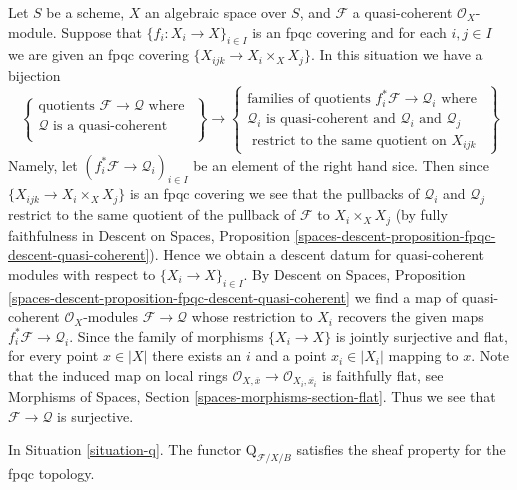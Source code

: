 \begin{remark}
\label{remark-q-sheaf}
Let $S$ be a scheme, $X$ an algebraic space over $S$, and $\mathcal{F}$
a quasi-coherent $\mathcal{O}_X$-module. Suppose that
$\{f_i : X_i \to X\}_{i \in I}$
is an fpqc covering and for each $i, j \in I$ we are given an fpqc covering
$\{X_{ijk} \to X_i \times_X X_j\}$. In this situation we have a bijection
$$
\left\{
\begin{matrix}
\text{quotients }\mathcal{F} \to \mathcal{Q}\text{ where } \\
\mathcal{Q}\text{ is a quasi-coherent }\\
\end{matrix}
\right\}
\longrightarrow
\left\{
\begin{matrix}
\text{families of quotients }f_i^*\mathcal{F} \to \mathcal{Q}_i
\text{ where } \\
\mathcal{Q}_i\text{ is quasi-coherent and }
\mathcal{Q}_i\text{ and }\mathcal{Q}_j\\
\text{ restrict to the same quotient on }X_{ijk}
\end{matrix}
\right\}
$$
Namely, let $(f_i^*\mathcal{F} \to \mathcal{Q}_i)_{i \in I}$
be an element of the right hand sice. Then since
$\{X_{ijk} \to X_i \times_X X_j\}$ is an fpqc covering we see that
the pullbacks of $\mathcal{Q}_i$ and $\mathcal{Q}_j$ restrict
to the same quotient of the pullback of $\mathcal{F}$ to $X_i \times_X X_j$
(by fully faithfulness in
Descent on Spaces, Proposition
\ref{spaces-descent-proposition-fpqc-descent-quasi-coherent}).
Hence we obtain a descent datum for quasi-coherent modules
with respect to $\{X_i \to X\}_{i \in I}$. By
Descent on Spaces, Proposition
\ref{spaces-descent-proposition-fpqc-descent-quasi-coherent}
we find a map of quasi-coherent $\mathcal{O}_X$-modules
$\mathcal{F} \to \mathcal{Q}$ whose restriction to $X_i$ recovers
the given maps $f_i^*\mathcal{F} \to \mathcal{Q}_i$.
Since the family of morphisms $\{X_i \to X\}$ is jointly surjective
and flat, for every point $x \in |X|$ there exists an $i$ and a point
$x_i \in |X_i|$ mapping to $x$. Note that the induced map on
local rings
$\mathcal{O}_{X, \overline{x}} \to \mathcal{O}_{X_i, \overline{x_i}}$
is faithfully flat, see
Morphisms of Spaces, Section \ref{spaces-morphisms-section-flat}.
Thus we see that $\mathcal{F} \to \mathcal{Q}$ is surjective.
\end{remark}

\begin{lemma}
\label{lemma-q-sheaf}
In Situation \ref{situation-q}. The functor $\text{Q}_{\mathcal{F}/X/B}$
satisfies the sheaf property for the fpqc topology.
\end{lemma}

